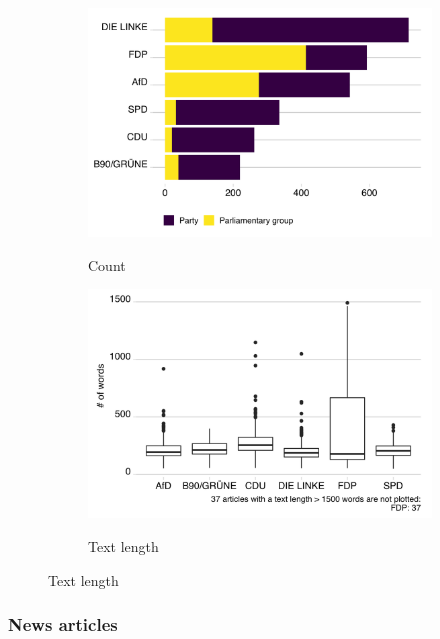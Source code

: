 \documentclass[12pt,a4paper,notitlepage]{article}
\begin{document}
\begin{figure}[H]
	\begin{center}
	\caption{Press releases}
		\begin{subfigure}[normla]{0.39\textwidth}
			\caption{Count}
			\includegraphics[width=\textwidth]{../figs/press_releases}
			\label{fig_press}
		\end{subfigure}
		\begin{subfigure}[normla]{0.59\textwidth}
			\caption{Text length}
			\includegraphics[width=\textwidth]{../figs/press_releases_textlength}
			\label{fig_press_textlength}
		\end{subfigure}
	\end{center}
\end{figure}


\subsubsection{News articles}
\end{document}
